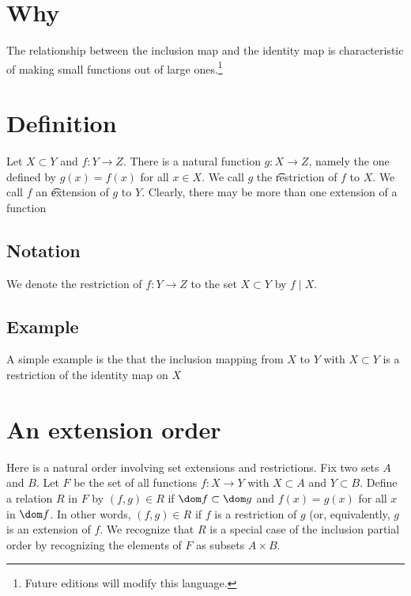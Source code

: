 
\section*{Why}

The relationship between the inclusion map and the identity map is characteristic of making small functions out of large ones.\footnote{Future editions will modify this language.}

\section*{Definition}

Let $X \subset Y$ and $f: Y \to Z$.
There is a natural function $g: X \to Z$, namely the one defined by $g(x) = f(x)$ for all $x \in X$.
We call $g$ the \t{restriction} of $f$ to $X$.
We call $f$ an \t{extension} of $g$ to $Y$.
Clearly, there may be more than one extension of a function

\subsection*{Notation}

We denote the restriction of $f: Y \to Z$ to the set $X \subset Y$ by $f\mid X$.

\subsection*{Example}

A simple example is the that the inclusion mapping from $X$ to $Y$ with $X \subset Y$ is a restriction of the identity map on $X$

\section*{An extension order}

Here is a natural order involving set extensions and restrictions.
Fix two sets $A$ and $B$.
Let $F$ be the set of all functions $f: X \to Y$ with $X \subset A$ and $Y \subset B$.
Define a relation $R$ in $F$ by $(f, g) \in R$ if $\dom f \subset \dom g$ and $f(x) = g(x)$ for all $x$ in $\dom f$.
In other words, $(f, g) \in R$ if $f$ is a restriction of $g$ (or, equivalently, $g$ is an extension of $f$.
We recognize that $R$ is a special case of the inclusion partial order by recognizing the elements of $F$ as subsets $A \times B$.

\blankpage